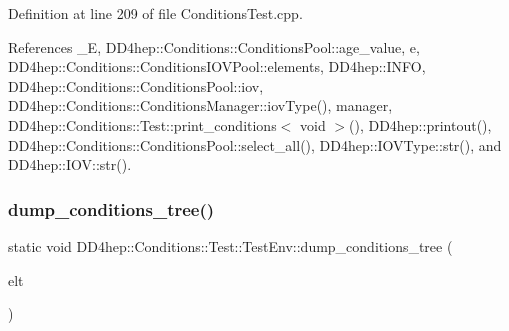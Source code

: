 Definition at line 209 of file Conditions\+Test.\+cpp.



References \+\_\+E, D\+D4hep\+::\+Conditions\+::\+Conditions\+Pool\+::age\+\_\+value, e, D\+D4hep\+::\+Conditions\+::\+Conditions\+I\+O\+V\+Pool\+::elements, D\+D4hep\+::\+I\+N\+FO, D\+D4hep\+::\+Conditions\+::\+Conditions\+Pool\+::iov, D\+D4hep\+::\+Conditions\+::\+Conditions\+Manager\+::iov\+Type(), manager, D\+D4hep\+::\+Conditions\+::\+Test\+::print\+\_\+conditions$<$ void $>$(), D\+D4hep\+::printout(), D\+D4hep\+::\+Conditions\+::\+Conditions\+Pool\+::select\+\_\+all(), D\+D4hep\+::\+I\+O\+V\+Type\+::str(), and D\+D4hep\+::\+I\+O\+V\+::str().

\hypertarget{struct_d_d4hep_1_1_conditions_1_1_test_1_1_test_env_a1cabe62789776e1356609988fcb03442}{}\label{struct_d_d4hep_1_1_conditions_1_1_test_1_1_test_env_a1cabe62789776e1356609988fcb03442} 
\subsubsection{\texorpdfstring{dump\+\_\+conditions\+\_\+tree()}{dump\_conditions\_tree()}\hspace{0.1cm}{\footnotesize\ttfamily [1/2]}}
{\footnotesize\ttfamily static void D\+D4hep\+::\+Conditions\+::\+Test\+::\+Test\+Env\+::dump\+\_\+conditions\+\_\+tree (\begin{DoxyParamCaption}\item[{\hyperlink{class_d_d4hep_1_1_geometry_1_1_det_element}{Det\+Element}}]{elt }\end{DoxyParamCaption})\hspace{0.3cm}{\ttfamily [static]}}

\hypertarget{struct_d_d4hep_1_1_conditions_1_1_test_1_1_test_env_ad3463aa0bb52943b896e9410019d4a5f}{}\label{struct_d_d4hep_1_1_conditions_1_1_test_1_1_test_env_ad3463aa0bb52943b896e9410019d4a5f} 
